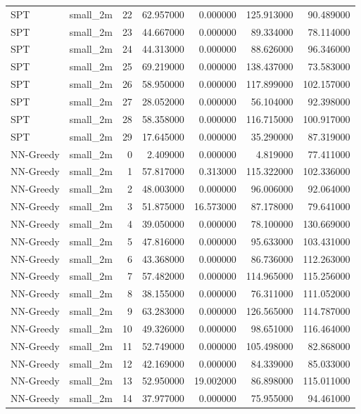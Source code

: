 \begin{tabular}{llrrrrr}
SPT & small_2m & 22 & 62.957000 & 0.000000 & 125.913000 & 90.489000 \\
SPT & small_2m & 23 & 44.667000 & 0.000000 & 89.334000 & 78.114000 \\
SPT & small_2m & 24 & 44.313000 & 0.000000 & 88.626000 & 96.346000 \\
SPT & small_2m & 25 & 69.219000 & 0.000000 & 138.437000 & 73.583000 \\
SPT & small_2m & 26 & 58.950000 & 0.000000 & 117.899000 & 102.157000 \\
SPT & small_2m & 27 & 28.052000 & 0.000000 & 56.104000 & 92.398000 \\
SPT & small_2m & 28 & 58.358000 & 0.000000 & 116.715000 & 100.917000 \\
SPT & small_2m & 29 & 17.645000 & 0.000000 & 35.290000 & 87.319000 \\
NN-Greedy & small_2m & 0 & 2.409000 & 0.000000 & 4.819000 & 77.411000 \\
NN-Greedy & small_2m & 1 & 57.817000 & 0.313000 & 115.322000 & 102.336000 \\
NN-Greedy & small_2m & 2 & 48.003000 & 0.000000 & 96.006000 & 92.064000 \\
NN-Greedy & small_2m & 3 & 51.875000 & 16.573000 & 87.178000 & 79.641000 \\
NN-Greedy & small_2m & 4 & 39.050000 & 0.000000 & 78.100000 & 130.669000 \\
NN-Greedy & small_2m & 5 & 47.816000 & 0.000000 & 95.633000 & 103.431000 \\
NN-Greedy & small_2m & 6 & 43.368000 & 0.000000 & 86.736000 & 112.263000 \\
NN-Greedy & small_2m & 7 & 57.482000 & 0.000000 & 114.965000 & 115.256000 \\
NN-Greedy & small_2m & 8 & 38.155000 & 0.000000 & 76.311000 & 111.052000 \\
NN-Greedy & small_2m & 9 & 63.283000 & 0.000000 & 126.565000 & 114.787000 \\
NN-Greedy & small_2m & 10 & 49.326000 & 0.000000 & 98.651000 & 116.464000 \\
NN-Greedy & small_2m & 11 & 52.749000 & 0.000000 & 105.498000 & 82.868000 \\
NN-Greedy & small_2m & 12 & 42.169000 & 0.000000 & 84.339000 & 85.033000 \\
NN-Greedy & small_2m & 13 & 52.950000 & 19.002000 & 86.898000 & 115.011000 \\
NN-Greedy & small_2m & 14 & 37.977000 & 0.000000 & 75.955000 & 94.461000 \\

\end{tabular}
